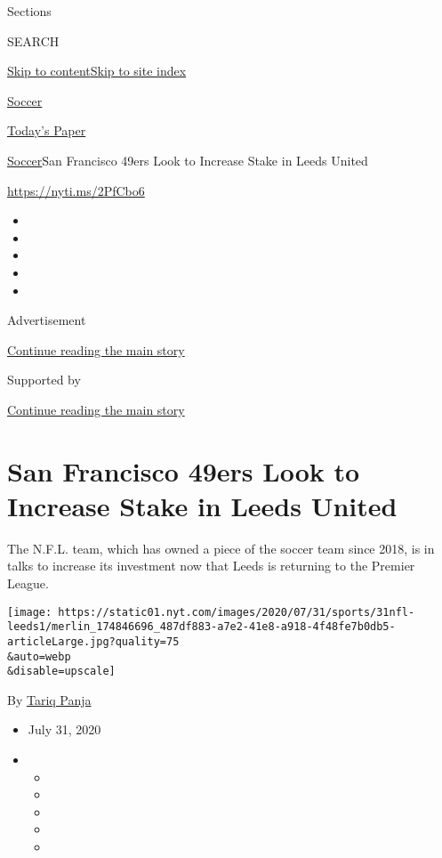 Sections

SEARCH

\protect\hyperlink{site-content}{Skip to
content}\protect\hyperlink{site-index}{Skip to site index}

\href{https://www.nytimes.com/section/sports/soccer}{Soccer}

\href{https://myaccount.nytimes.com/auth/login?response_type=cookie\&client_id=vi}{}

\href{https://www.nytimes.com/section/todayspaper}{Today's Paper}

\href{/section/sports/soccer}{Soccer}\textbar{}San Francisco 49ers Look
to Increase Stake in Leeds United

\url{https://nyti.ms/2PfCbo6}

\begin{itemize}
\item
\item
\item
\item
\item
\end{itemize}

Advertisement

\protect\hyperlink{after-top}{Continue reading the main story}

Supported by

\protect\hyperlink{after-sponsor}{Continue reading the main story}

\hypertarget{san-francisco-49ers-look-to-increase-stake-in-leeds-united}{%
\section{San Francisco 49ers Look to Increase Stake in Leeds
United}\label{san-francisco-49ers-look-to-increase-stake-in-leeds-united}}

The N.F.L. team, which has owned a piece of the soccer team since 2018,
is in talks to increase its investment now that Leeds is returning to
the Premier League.

\texttt{[image: https://static01.nyt.com/images/2020/07/31/sports/31nfl-leeds1/merlin\_174846696\_487df883-a7e2-41e8-a918-4f48fe7b0db5-articleLarge.jpg?quality=75\\\&auto=webp\\\&disable=upscale]}

By \href{https://www.nytimes.com/by/tariq-panja}{Tariq Panja}

\begin{itemize}
\item
  July 31, 2020
\item
  \begin{itemize}
  \item
  \item
  \item
  \item
  \item
  \end{itemize}
\end{itemize}

